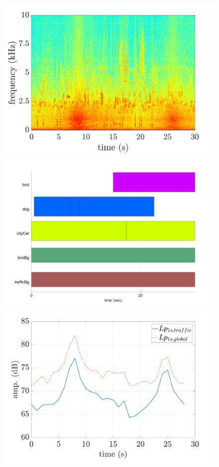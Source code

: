 \documentclass[twocolumn,a4paper,10pt]{article}
\begin{document}
\begin{figure}
\centering
   \begin{minipage}[c]{.32\linewidth}
      \includegraphics[width =\linewidth]{figures/spectrogramExample.pdf}
   \end{minipage}
   \begin{minipage}[c]{.32\linewidth}
      \includegraphics[width =\linewidth]{figures/animals_10-pianoRoll.png}
   \end{minipage}
   \begin{minipage}[c]{.32\linewidth}
      \includegraphics[width =\linewidth]{figures/evolutionLpExample.pdf}


\end{minipage}
\end{figure}
\end{document}
